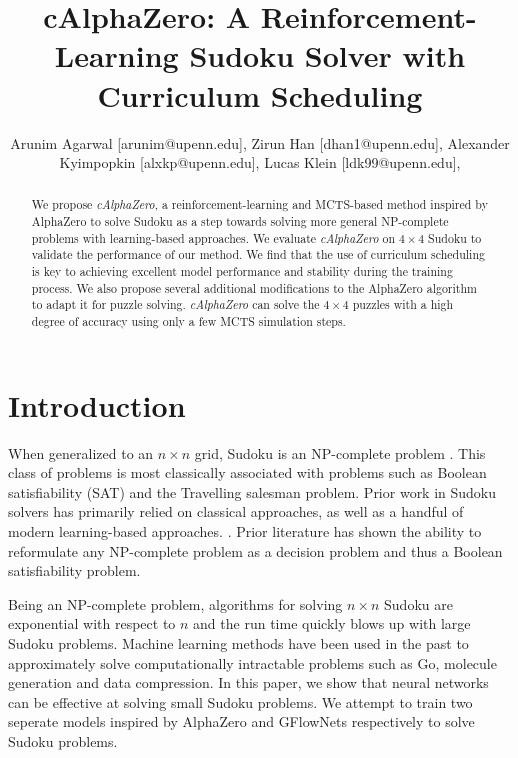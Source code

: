 \documentclass[10pt, reqno, letterpaper, twoside]{amsart}
\title{cAlphaZero: A Reinforcement-Learning Sudoku Solver with Curriculum Scheduling}
\author{
Arunim Agarwal [arunim@upenn.edu],
Zirun Han [dhan1@upenn.edu],
Alexander Kyimpopkin [alxkp@upenn.edu],
Lucas Klein [ldk99@upenn.edu],
}
\begin{document}
\begin{abstract}
We propose \textit{cAlphaZero}, a reinforcement-learning and MCTS-based method inspired by AlphaZero to solve Sudoku as a step towards solving more general NP-complete problems with learning-based approaches.   We evaluate \textit{cAlphaZero} on $4 \times 4$ Sudoku to validate the performance of our method.  We find that the use of curriculum scheduling is key to achieving excellent model performance and stability during the training process. We also propose several additional modifications to the AlphaZero algorithm to adapt it for puzzle solving. \textit{cAlphaZero} can solve the $4 \times 4$ puzzles with a high degree of accuracy using only a few MCTS simulation steps. 
\end{abstract}

\maketitle

\section{Introduction}
When generalized to an $n \times n $ grid, Sudoku is an NP-complete problem \cite{yato2003complexity}.  This class of problems is most classically associated with problems such as Boolean satisfiability (SAT) and the Travelling salesman problem.  Prior work in Sudoku solvers has primarily relied on classical approaches, as well as a handful of modern learning-based approaches. \cite{mehta2021reinforcement}.  Prior literature has shown the ability to reformulate any NP-complete problem as a decision problem and thus a Boolean satisfiability problem.

Being an NP-complete problem, algorithms for solving $n\times n$ Sudoku are exponential with respect to $n$ and the run time quickly blows up with large Sudoku problems. Machine learning methods have been used in the past to approximately solve computationally intractable problems such as Go, molecule generation and data compression. \cite{Silver2018}\cite{bengio2021flow}\cite{yang2023introduction} In this paper, we show that neural networks can be effective at solving small Sudoku problems. We attempt to train two seperate models inspired by AlphaZero and GFlowNets respectively to solve Sudoku problems.
\end{document}
